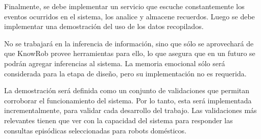 Finalmente, se debe implementar un servicio que escuche constantemente los eventos ocurridos en el sistema, los analice y almacene recuerdos. Luego se debe implementar una demostración del uso de los datos recopilados.

No se trabajará en la inferencia de información, sino que sólo se aprovechará de que KnowRob provee herramientas para ello, lo que asegura que en un futuro se podrán agregar inferencias al sistema. La memoria emocional sólo será considerada para la etapa de diseño, pero su implementación no es requerida.


La demostración será definida como un conjunto de validaciones que permitan corroborar el funcionamiento del sistema. Por lo tanto, esta será implementada incrementalmente, para validar cada desarrollo del trabajo. Las validaciones más relevantes tienen que ver con la capacidad del sistema para responder las consultas episódicas seleccionadas para robots domésticos.








